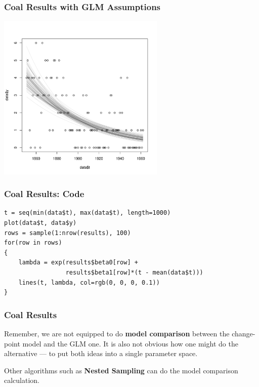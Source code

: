 \documentclass{beamer}
\begin{document}
\begin{frame}[fragile]
\frametitle{Coal Results with GLM Assumptions}

\begin{center}
\includegraphics[width=0.6\textwidth]{images/coal_curves.pdf}
\end{center}
\end{frame}


\begin{frame}[fragile]
\frametitle{Coal Results: Code}

\begin{verbatim}
t = seq(min(data$t), max(data$t), length=1000)
plot(data$t, data$y)
rows = sample(1:nrow(results), 100)
for(row in rows)
{
    lambda = exp(results$beta0[row] +
                 results$beta1[row]*(t - mean(data$t)))
    lines(t, lambda, col=rgb(0, 0, 0, 0.1))
}
\end{verbatim}
\end{frame}


\begin{frame}[fragile]
\frametitle{Coal Results}
Remember, we are not equipped to do {\bf model comparison} between the
change-point model and the GLM one. It is also not obvious how one might
do the alternative --- to put both ideas into a single parameter space.\\[0.5em]\pause

Other algorithms such as {\bf Nested Sampling} can do the model comparison
calculation.
\end{frame}
\end{document}
